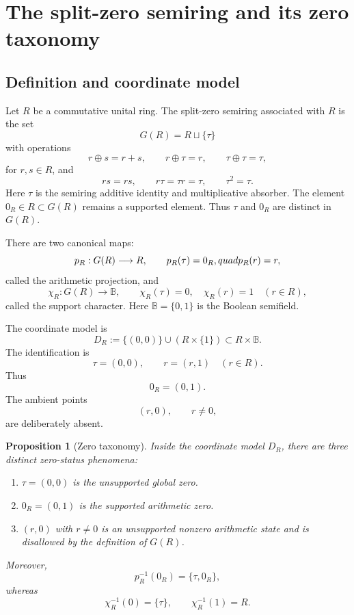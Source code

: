 \documentclass[11pt]{amsart}
\newtheorem{proposition}[theorem]{Proposition}
\newcommand{\BB}{\mathbb B}
\newcommand{\tauz}{\tau}
\begin{document}
\section{The split-zero semiring and its zero taxonomy}

\subsection{Definition and coordinate model}

Let $R$ be a commutative unital ring.  The split-zero semiring associated with $R$ is the set
\[
       G(R)=R\sqcup\{\tauz\}
\]
with operations
\[
       r\oplus s=r+s,
       \qquad
       r\oplus\tauz=r,
       \qquad
       \tauz\oplus\tauz=\tauz,
\]
for $r,s\in R$, and
\[
       rs=rs,
       \qquad
       r\tauz=\tauz r=\tauz,
       \qquad
       \tauz^2=\tauz.
\]
Here $\tauz$ is the semiring additive identity and multiplicative absorber.  The element $0_R\in R\subset G(R)$ remains a supported element.  Thus $\tauz$ and $0_R$ are distinct in $G(R)$.

There are two canonical maps:
\[
       p_R:G(R)\longrightarrow R,
       \qquad
       p_R(\tauz)=0_R,\\quad p_R(r)=r,
\]
called the arithmetic projection, and
\[
       \chi_R:G(R)\longrightarrow \BB,
       \qquad
       \chi_R(\tauz)=0,
       \quad \chi_R(r)=1\quad(r\in R),
\]
called the support character.  Here $\BB=\{0,1\}$ is the Boolean semifield.

The coordinate model is
\[
       D_R:=\{(0,0)\}\cup (R\times\{1\})\subset R\times\BB.
\]
The identification is
\[
       \tauz=(0,0),
       \qquad
       r=(r,1)\quad(r\in R).
\]
Thus
\[
       0_R=(0,1).
\]
The ambient points
\[
       (r,0),\qquad r\ne0,
\]
are deliberately absent.

\begin{proposition}[Zero taxonomy]
Inside the coordinate model $D_R$, there are three distinct zero-status phenomena:
\begin{enumerate}[label=(\alph*)]
\item $\tauz=(0,0)$ is the unsupported global zero.
\item $0_R=(0,1)$ is the supported arithmetic zero.
\item $(r,0)$ with $r\ne0$ is an unsupported nonzero arithmetic state and is disallowed by the definition of $G(R)$.
\end{enumerate}
Moreover,
\[
       p_R^{-1}(0_R)=\{\tauz,0_R\},
\]
whereas
\[
       \chi_R^{-1}(0)=\{\tauz\},
       \qquad
       \chi_R^{-1}(1)=R.
\]
\end{proposition}
\end{document}
